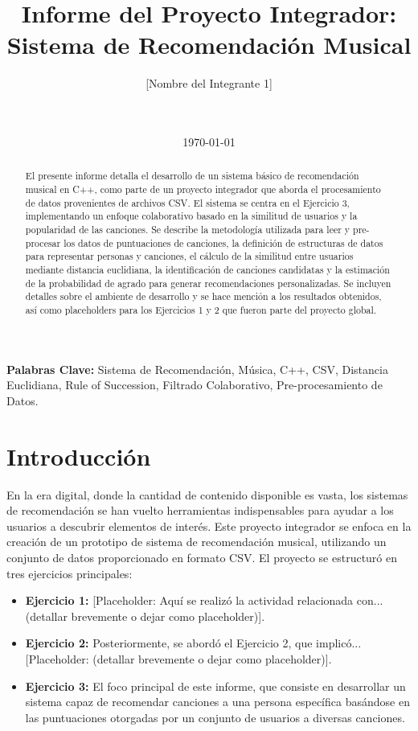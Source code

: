 \documentclass{article}
\title{Informe del Proyecto Integrador: Sistema de Recomendación Musical}
\author{%
    [Nombre del Integrante 1] \\
    [Nombre del Integrante 2] \\
    [Nombre del Integrante 3] \\
}
\date{\today} %
\newcommand{\keywords}[1]{\textbf{Palabras Clave:} #1}
\begin{document}
\maketitle %


\begin{abstract}
El presente informe detalla el desarrollo de un sistema básico de recomendación musical en C++, como parte de un proyecto integrador que aborda el procesamiento de datos provenientes de archivos CSV. El sistema se centra en el Ejercicio 3, implementando un enfoque colaborativo basado en la similitud de usuarios y la popularidad de las canciones. Se describe la metodología utilizada para leer y pre-procesar los datos de puntuaciones de canciones, la definición de estructuras de datos para representar personas y canciones, el cálculo de la similitud entre usuarios mediante distancia euclidiana, la identificación de canciones candidatas y la estimación de la probabilidad de agrado para generar recomendaciones personalizadas. Se incluyen detalles sobre el ambiente de desarrollo y se hace mención a los resultados obtenidos, así como placeholders para los Ejercicios 1 y 2 que fueron parte del proyecto global.
\end{abstract}

\keywords{Sistema de Recomendación, Música, C++, CSV, Distancia Euclidiana, Rule of Succession, Filtrado Colaborativo, Pre-procesamiento de Datos.}

\section{Introducción}

En la era digital, donde la cantidad de contenido disponible es vasta, los sistemas de recomendación se han vuelto herramientas indispensables para ayudar a los usuarios a descubrir elementos de interés. Este proyecto integrador se enfoca en la creación de un prototipo de sistema de recomendación musical, utilizando un conjunto de datos proporcionado en formato CSV. El proyecto se estructuró en tres ejercicios principales:

\begin{itemize}
    \item \textbf{Ejercicio 1:} [Placeholder: Aquí se realizó la actividad relacionada con... (detallar brevemente o dejar como placeholder)].
    \item \textbf{Ejercicio 2:} Posteriormente, se abordó el Ejercicio 2, que implicó... [Placeholder: (detallar brevemente o dejar como placeholder)].
    \item \textbf{Ejercicio 3:} El foco principal de este informe, que consiste en desarrollar un sistema capaz de recomendar canciones a una persona específica basándose en las puntuaciones otorgadas por un conjunto de usuarios a diversas canciones.
\end{itemize}
\end{document}
